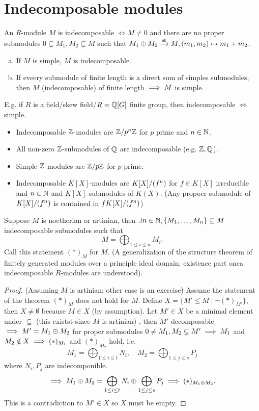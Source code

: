 \documentclass[a4paper]{report}
\begin{document}
\section{Indecomposable modules}
\begin{defi}
An $R$-module $M$ is indecomposable $\iff M \ne 0$ and there are no proper submodules $0 \subsetneq M_{1}, M_{2} \subsetneq M$ such that $M_{1} \oplus M_{2} \xrightarrow \cong M, (m_{1},m_{2}) \mapsto m_{1}+m_{2}$.
\end{defi}
\begin{rem*}
\begin{enumerate}[(a)]
  \item If $M$ is simple, $M$ is indecomposable.
        \item If eveery submodule of finite length is a direct sum of simples submodules, then $M$ (indecomposable) of finite length $\implies M$ is simple.
\end{enumerate}
E.g. if $R$ is a field/skew field/$R = \mathbb{Q}[G]$ finite group, then indecomposable $\iff$ simple.
\end{rem*}
\begin{exmps*}
  \begin{itemize}
  \item Indecomposable $\mathbb{Z}$-modules are $\fak \Z{p^{n}\Z}$ for $p$ prime and $n \in\mathbb{N}$.
    \item All non-zero $\mathbb{Z}$-submodules of $\mathbb{Q}$ are indecomposable (e.g. $\mathbb{Z}, \mathbb{Q}$).
    \item Simple $\mathbb{Z}$-modules are $\fak \Z{p\Z}$ for $p$ prime.
          \item Indecomposable $K[X]$-modules are $\fak{K[X]}{(f^{n})}$ for $f \in K[X]$ irreducible and $n \in \mathbb{N}$ and $K[X]$-submodules of $K(X)$. (Any propoer submodule of $\fak{K[X]}{(f^{n})}$ is contained in $\fak{f K[X]}{(f^{n})}$)
  \end{itemize}
\end{exmps*}
\begin{thm}Suppose $M$ is noetherian or artinian, then $\exists n \in \mathbb{N}, \{M_{1}, \ldots, M_{n}\} \subseteq M$ indecomposable submodules such that \[M = \bigoplus_{1 \le i \le n} M_{i}.\]
  Call this statement $(*)_{M}$ for $M$. (A generalization of the structure theorem of finitely generated modules over a principle ideal domain; existence part onca indecomposable $R$-modules are understood).
  \begin{proof}(Assuming $M$ is artinian; other case is an exercise)
    Assume the statement of the theorem $(*)_{M}$ does not hold for $M$. Define $X = \{M' \le M \mid \neg (*)_{M'}\}$, then $X \ne \emptyset$ because $M \in X$ (by assumption). Let $M' \in X$ be a minimal element under $\subseteq$ (this existst since $M$ is artinian) , then $M'$ decomposable $\implies M' = M_{1} \oplus M_{2}$ for proper submodules $0 \ne M_{1}, M_{2} \subsetneq M' \implies  M_{1}$ and $M_{2} \notin X \implies (*)_{M_{1}}$ and $(*)_{M_{2}}$ hold, i.e.
    \[M_{1} = \bigoplus_{1 \le i \le t}N_{i}, \quad M_{2} = \bigoplus_{1 \le j \le s}P_{j}\]where $N_{i}, P_{j}$ are indecomponible. \[\implies M_{1} \oplus M_{2} = \bigoplus_{1 \le i \le t}N_{i} \oplus \bigoplus_{1 \le j \le s}P_{j} \implies (*)_{M_{1} \oplus M_{2}}.\]
    This is a contradiction to $M' \in X$ so $X$ must be empty.\qedhere
  \end{proof}
\end{thm}
\end{document}
